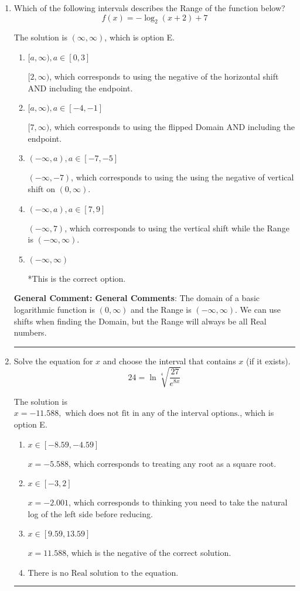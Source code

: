\documentclass{extbook}[14pt]
\newcommand{\litem}[1]{\item #1

\rule{\textwidth}{0.4pt}}
\begin{document}
\begin{enumerate}\litem{
Which of the following intervals describes the Range of the function below?
\[ f(x) = -\log_2{(x+2)}+7 \]

The solution is \( (\infty, \infty) \), which is option E.\begin{enumerate}[label=\Alph*.]
\item \( [a, \infty), a \in [0, 3] \)

$[2, \infty)$, which corresponds to using the negative of the horizontal shift AND including the endpoint.
\item \( [a, \infty), a \in [-4, -1] \)

$[7, \infty)$, which corresponds to using the flipped Domain AND including the endpoint.
\item \( (-\infty, a), a \in [-7, -5] \)

$(-\infty, -7)$, which corresponds to using the using the negative of vertical shift on $(0, \infty)$.
\item \( (-\infty, a), a \in [7, 9] \)

$(-\infty, 7)$, which corresponds to using the vertical shift while the Range is $(-\infty, \infty)$.
\item \( (-\infty, \infty) \)

*This is the correct option.
\end{enumerate}

\textbf{General Comment:} \textbf{General Comments}: The domain of a basic logarithmic function is $(0, \infty)$ and the Range is $(-\infty, \infty)$. We can use shifts when finding the Domain, but the Range will always be all Real numbers.
}
\litem{
 Solve the equation for $x$ and choose the interval that contains $x$ (if it exists).
\[  24 = \ln{\sqrt[4]{\frac{27}{e^{8x}}}} \]

The solution is \( x = -11.588, \text{ which does not fit in any of the interval options.} \), which is option E.\begin{enumerate}[label=\Alph*.]
\item \( x \in [-8.59, -4.59] \)

$x = -5.588$, which corresponds to treating any root as a square root.
\item \( x \in [-3, 2] \)

$x = -2.001$, which corresponds to thinking you need to take the natural log of the left side before reducing.
\item \( x \in [9.59, 13.59] \)

$x = 11.588$, which is the negative of the correct solution.
\item \( \text{There is no Real solution to the equation.} \)


\end{enumerate}}
\end{enumerate}
\end{document}
